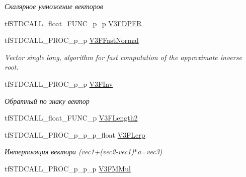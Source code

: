 \begin{DoxyCompactItemize}
\begin{DoxyCompactList}\small\item\em Скалярное умножение векторов \end{DoxyCompactList}\item 
tf\-S\-T\-D\-C\-A\-L\-L\-\_\-float\-\_\-\-F\-U\-N\-C\-\_\-p\-\_\-p \hyperlink{structs_functions_vector_c_p_u_a1876b1b184205e75650053fee41b184f}{V3\-F\-D\-P\-F\-R}
\item 
\hypertarget{structs_functions_vector_c_p_u_afe7bd8560c9daba20b0230366ae60307}{tf\-S\-T\-D\-C\-A\-L\-L\-\_\-\-P\-R\-O\-C\-\_\-p\-\_\-p \hyperlink{structs_functions_vector_c_p_u_afe7bd8560c9daba20b0230366ae60307}{V3\-F\-Fast\-Normal}}\label{structs_functions_vector_c_p_u_afe7bd8560c9daba20b0230366ae60307}

\begin{DoxyCompactList}\small\item\em Vector single long, algorithm for fast computation of the approximate inverse root. \end{DoxyCompactList}\item 
\hypertarget{structs_functions_vector_c_p_u_a48634490c2d318f7de5a6ffa2cc343ce}{tf\-S\-T\-D\-C\-A\-L\-L\-\_\-\-P\-R\-O\-C\-\_\-p\-\_\-p \hyperlink{structs_functions_vector_c_p_u_a48634490c2d318f7de5a6ffa2cc343ce}{V3\-F\-Inv}}\label{structs_functions_vector_c_p_u_a48634490c2d318f7de5a6ffa2cc343ce}

\begin{DoxyCompactList}\small\item\em Обратный по знаку вектор \end{DoxyCompactList}\item 
tf\-S\-T\-D\-C\-A\-L\-L\-\_\-float\-\_\-\-F\-U\-N\-C\-\_\-p \hyperlink{structs_functions_vector_c_p_u_a519776ab2ab266aab8f8185f70d43698}{V3\-F\-Length2}
\item 
\hypertarget{structs_functions_vector_c_p_u_ac51e1dbcc53863f560bc75843f7732ca}{tf\-S\-T\-D\-C\-A\-L\-L\-\_\-\-P\-R\-O\-C\-\_\-p\-\_\-p\-\_\-p\-\_\-float \hyperlink{structs_functions_vector_c_p_u_ac51e1dbcc53863f560bc75843f7732ca}{V3\-F\-Lerp}}\label{structs_functions_vector_c_p_u_ac51e1dbcc53863f560bc75843f7732ca}

\begin{DoxyCompactList}\small\item\em Интерполяция вектора (vec1+(vec2-\/vec1)$\ast$a=vec3) \end{DoxyCompactList}\item 
\hypertarget{structs_functions_vector_c_p_u_adc4b8ec5c72a51f24395aff728911085}{tf\-S\-T\-D\-C\-A\-L\-L\-\_\-\-P\-R\-O\-C\-\_\-p\-\_\-p\-\_\-p \hyperlink{structs_functions_vector_c_p_u_adc4b8ec5c72a51f24395aff728911085}{V3\-F\-M\-Mul}}\label{structs_functions_vector_c_p_u_adc4b8ec5c72a51f24395aff728911085}


\end{DoxyCompactItemize}
